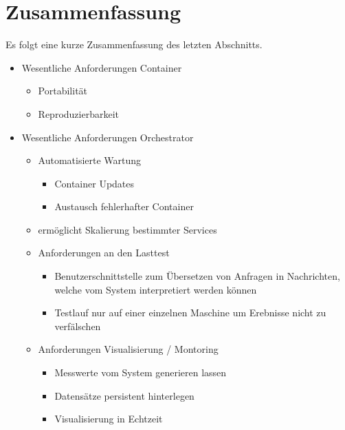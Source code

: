\section{Zusammenfassung}

Es folgt eine kurze Zusammenfassung des letzten Abschnitts.

\begin{itemize}
  \item Wesentliche Anforderungen Container
  \begin{itemize}
    \item Portabilität
    \item Reproduzierbarkeit
  \end{itemize}
  \item Wesentliche Anforderungen Orchestrator
  \begin{itemize}
    \item Automatisierte Wartung 
    \begin{itemize}
      \item Container Updates
      \item Austausch fehlerhafter Container
    \end{itemize}
    \item ermöglicht Skalierung bestimmter Services
  \end{itemize}
  \begin{itemize}
    \item Anforderungen an den Lasttest
    \begin{itemize}
      \item Benutzerschnittstelle zum Übersetzen von Anfragen in Nachrichten, welche vom System interpretiert werden können
      \item Testlauf nur auf einer einzelnen Maschine um Erebnisse nicht zu verfälschen
    \end{itemize}
  \end{itemize}
  \begin{itemize}
    \item Anforderungen Visualisierung / Montoring
    \begin{itemize}
      \item Messwerte vom System generieren lassen
      \item Datensätze persistent hinterlegen
      \item Visualisierung in Echtzeit
    \end{itemize}
  \end{itemize}
\end{itemize}

